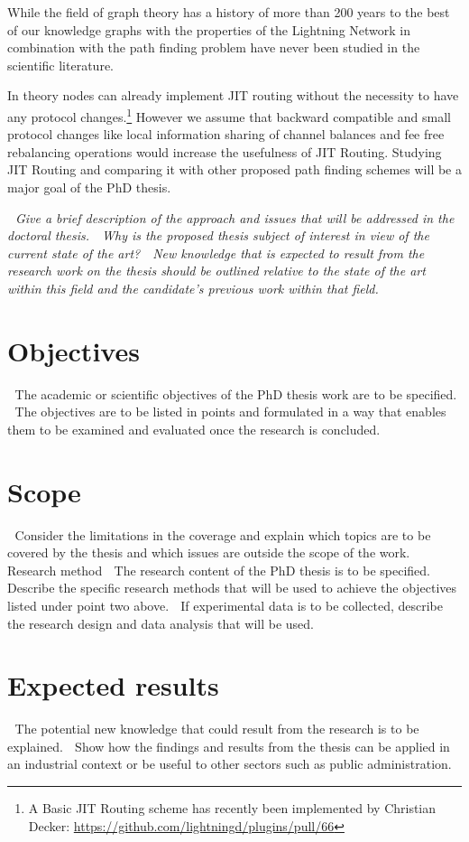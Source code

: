 \documentclass[a4paper,latin]{paper}
\begin{document}
While the field of graph theory has a history of more than 200 years to the best of our knowledge graphs with the properties of the Lightning Network in combination with the path finding problem have never been studied in the scientific literature.

In theory nodes can already implement JIT routing without the necessity to have any protocol changes.\footnote{A Basic JIT Routing scheme has recently been implemented by Christian Decker: \url{https://github.com/lightningd/plugins/pull/66}}
However we assume that backward compatible and small protocol changes like local information sharing of channel balances and fee free rebalancing operations would increase the usefulness of JIT Routing.
Studying JIT Routing and comparing it with other proposed path finding schemes will be a major goal of the PhD thesis. 





\textit{ Give a brief description of the approach and issues that will be addressed in the doctoral thesis.
 Why is the proposed thesis subject of interest in view of the current state of the art?
 New knowledge that is expected to result from the research work on the thesis should be
outlined relative to the state of the art within this field and the candidate’s previous work within
that field.}
\section{Objectives}
 The academic or scientific objectives of the PhD thesis work are to be specified.
 The objectives are to be listed in points and formulated in a way that enables them to be
examined and evaluated once the research is concluded.
\section{Scope}
 Consider the limitations in the coverage and explain which topics are to be covered by the thesis
and which issues are outside the scope of the work.
Research method
 The research content of the PhD thesis is to be specified.
 Describe the specific research methods that will be used to achieve the objectives listed under
point two above.
 If experimental data is to be collected, describe the research design and data analysis that will be
used.
\section{Expected results}
 The potential new knowledge that could result from the research is to be explained.
 Show how the findings and results from the thesis can be applied in an industrial context or be
useful to other sectors such as public administration.
\end{document}

